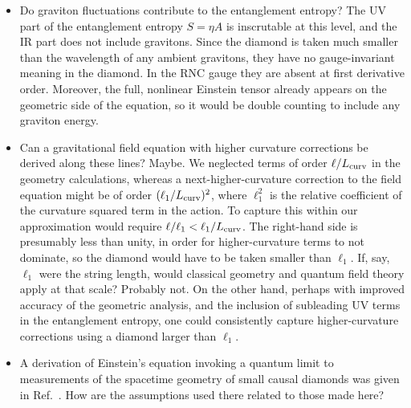 \documentclass[aps,prd,showpacs,groupedaddress,nofootinbib,longbibliography,12pt]{revtex4-1}
\begin{document}
\begin{itemize}

\item Do graviton fluctuations contribute to the entanglement entropy? 
The UV part of the entanglement entropy $S=\eta A$ is inscrutable  at this level,
and the IR part does not include gravitons. Since the diamond is taken much smaller than the wavelength of any ambient gravitons, 
they have no gauge-invariant meaning in the diamond. In the RNC gauge they are absent at first derivative order.
Moreover, the full, nonlinear Einstein tensor already appears on the geometric side of the equation, 
so it would be double counting to include any graviton energy. 

\item Can a gravitational field equation with higher curvature corrections be derived along these lines? Maybe.  
We neglected terms of order $\ell/L_{\rm curv}$ in the geometry calculations, whereas a next-higher-curvature correction to the field equation might be of order $(\ell_1/L_{\rm curv})^2$, where $\ell_1^2$ is the relative coefficient of the curvature squared term in the action. To capture this within our approximation would require $\ell/\ell_1<\ell_1/L_{\rm curv}$. The right-hand side is presumably less than unity, in order for higher-curvature terms to not dominate, so the diamond would have to be taken smaller than $\ell_1$.  If, say, $\ell_1$ were the string length,
would classical geometry and quantum field theory apply at that scale? Probably not. On the other hand, perhaps with improved accuracy of the geometric analysis, and the inclusion of subleading UV terms in the entanglement entropy, one could consistently capture higher-curvature corrections using a diamond larger than $\ell_1$.


\item A derivation of Einstein's equation invoking a quantum limit to measurements of the spacetime geometry of small causal diamonds was given in Ref.~\cite{Lloyd:2012du}. How are the assumptions used there related to those made here?


\end{itemize}
\end{document}
